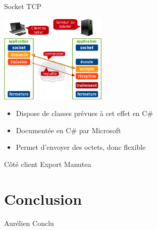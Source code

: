 \documentclass[a4paper,10pt]{beamer}
\begin{document}
	\begin{frame}{Socket TCP}
		\centerline{\includegraphics[height=120pt]{images/network/tcp-socket.png}}
		
		\begin{itemize}
			\item Dispose de classes prévues à cet effet en C\#
			\item Documentée en C\# par Microsoft
			\item Permet d'envoyer des octets, donc flexible
		\end{itemize}
	\end{frame}
	
	\begin{frame}{Côté client}
		Export Manutea
	\end{frame}
	
	\section{Conclusion}
	
	\begin{frame}
		Aurélien Conclu
	\end{frame}
		
\end{document}
